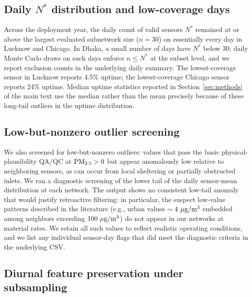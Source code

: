 \subsection{Daily $N^*$ distribution and low-coverage days}\label{sec:si_nstar_distribution}

Across the deployment year, the daily count of valid sensors $N^*$ remained at or above the largest evaluated subnetwork size ($n=30$) on essentially every day in Lucknow and Chicago. In Dhaka, a small number of days have $N^*$ below 30; daily Monte Carlo draws on such days enforce $n \le N^*$ at the subset level, and we report exclusion counts in the underlying daily summary. The lowest-coverage sensor in Lucknow reports 4.5\% uptime; the lowest-coverage Chicago sensor reports 24\% uptime. Median uptime statistics reported in Section~\ref{sec:methods} of the main text use the median rather than the mean precisely because of these long-tail outliers in the uptime distribution.

\subsection{Low-but-nonzero outlier screening}\label{sec:si_low_tail}

We also screened for low-but-nonzero outliers: values that pass the basic physical-plausibility QA/QC at $\textrm{PM\textsubscript{2.5}} > 0$ but appear anomalously low relative to neighboring sensors, as can occur from local sheltering or partially obstructed inlets. We ran a diagnostic screening of the lower tail of the daily sensor-mean distribution at each network. The output shows no consistent low-tail anomaly that would justify retroactive filtering: in particular, the suspect low-value patterns described in the literature (e.g., urban values $\sim 4~\mu\textrm{g}/\textrm{m}\textsuperscript{3}$ embedded among neighbors exceeding $100~\mu\textrm{g}/\textrm{m}\textsuperscript{3}$) do not appear in our networks at material rates. We retain all such values to reflect realistic operating conditions, and we list any individual sensor-day flags that did meet the diagnostic criteria in the underlying CSV.

\subsection{Diurnal feature preservation under subsampling}\label{sec:si_diurnal_preservation}

